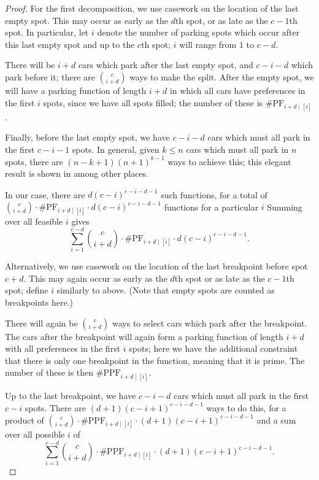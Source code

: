 \documentclass[12 pt]{amsart}
\theoremstyle{definition} %
\theoremstyle{remark} %
\begin{document}
\begin{proof}
    For the first decomposition, we use casework on the location of the last empty spot. This may occur as early as the $d$th spot, or as late as the $c-1$th spot. In particular, let $i$ denote the number of parking spots which occur after this last empty spot and up to the $c$th spot; $i$ will range from $1$ to $c-d$.

    There will be $i+d$ cars which park after the last empty spot, and $c-i-d$ which park before it; there are $\binom{c}{i+d}$ ways to make the split. After the empty spot, we will have a parking function of length $i+d$ in which all cars have preferences in the first $i$ spots, since we have all spots filled; the number of these is $\# \mathrm{PF}_{i+d \mid [i]}$.
    
    Finally, before the last empty spot, we have $c-i-d$ cars which must all park in the first $c-i-1$ spots. In general, given $k\leq n$ cars which must all park in $n$ spots, there are $(n-k+1)(n+1)^{k-1}$ ways to achieve this; this elegant result is shown in \cite{cameron-johannsen-prellberg-schweitzer-2008} among other places.
    
    In our case, there are $d(c-i)^{c-i-d-1}$ such functions, for a total of $\binom{c}{i+d}\cdot\# \mathrm{PF}_{i+d \mid [i]}\cdot d(c-i)^{c-i-d-1}$ functions for a particular $i$ Summing over all feasible $i$ gives \[\sum_{i=1}^{c-d} \binom{c}{i+d}\cdot\# \mathrm{PF}_{i+d \mid [i]}\cdot d(c-i)^{c-i-d-1}.\]

    Alternatively, we use casework on the location of the last breakpoint before spot $c+d$. This may again occur as early as the $d$th spot or as late as the $c-1$th spot; define $i$ similarly to above. (Note that empty spots are counted as breakpoints here.)

    There will again be $\binom{c}{i+d}$ ways to select cars which park after the breakpoint. The cars after the breakpoint will again form a parking function of length $i+d$ with all preferences in the first $i$ spots; here we have the additional constraint that there is only one breakpoint in the function, meaning that it is prime. The number of these is then $\# \mathrm{PPF}_{i+d \mid [i]}$.

    Up to the last breakpoint, we have $c-i-d$ cars which must all park in the first $c-i$ spots. There are $(d+1)(c-i+1)^{c-i-d-1}$ ways to do this, for a product of $\binom{c}{i+d}\cdot\# \mathrm{PPF}_{i+d \mid [i]}\cdot (d+1)(c-i+1)^{c-i-d-1}$ and a sum over all possible $i$ of \[\sum_{i=1}^{c-d} \binom{c}{i+d}\cdot\# \mathrm{PPF}_{i+d \mid [i]}\cdot (d+1)(c-i+1)^{c-i-d-1}.\]
\end{proof}
\end{document}
